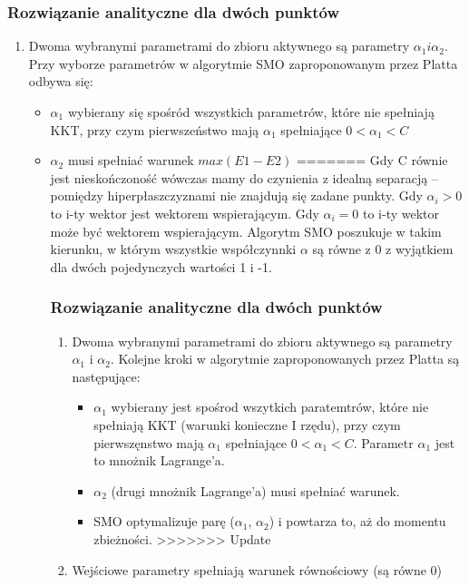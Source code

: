 \documentclass[[10pt,a4paper]{article}
\begin{document}
\subsubsection{Rozwiązanie analityczne dla dwóch punktów}
\begin{enumerate}
\item Dwoma wybranymi parametrami do zbioru aktywnego są parametry $\alpha_1 i \alpha_2$. Przy wyborze parametrów w algorytmie SMO zaproponowanym przez Platta odbywa się:
\begin{itemize}
\item $\alpha_1$ wybierany się spośród wszystkich parametrów, które nie spełniają KKT, przy czym pierwszeństwo mają $\alpha_1$ spełniające $ 0 < \alpha_{1} < C $
\item $\alpha_2$ musi spełniać warunek $max(E1-E2)$
=======
Gdy C równie jest nieskończoność wówczas mamy do czynienia z idealną separacją – pomiędzy hiperpłaszczyznami nie znajdują się zadane punkty. 
Gdy $\alpha_{i} > 0 $ to i-ty wektor jest wektorem wspierającym.
Gdy $\alpha_{i} = 0 $ to i-ty wektor może być wektorem wspierającym.
\newline
Algorytm SMO poszukuje w takim kierunku, w którym wszystkie współczynnki $\alpha$ są równe z 0 z wyjątkiem dla dwóch pojedynczych wartości 1 i -1. 

\subsubsection{Rozwiązanie analityczne dla dwóch punktów}
\begin{enumerate}
\item Dwoma wybranymi parametrami do zbioru aktywnego są parametry $\alpha_1$ i $ \alpha_2$. Kolejne kroki w algorytmie zaproponowanych przez Platta są następujące:
\begin{itemize}
\item $\alpha_1$ wybierany jest spośrod wszytkich paratemtrów, które nie spełniają KKT (warunki konieczne I rzędu), przy czym pierwszęnstwo mają $\alpha_1$ spełniające $ 0 < \alpha_{1} < C $. Parametr $\alpha_1$ jest to mnożnik Lagrange'a. 
\item $\alpha_2$ (drugi mnożnik Lagrange'a) musi spełniać warunek. 
\item SMO optymalizuje parę ($\alpha_1$, $\alpha_2$) i powtarza to, aż do momentu zbieżności. 
>>>>>>> Update
\end{itemize}
\item Wejściowe parametry spełniają warunek równościowy (są równe 0)



\end{enumerate}
\end{itemize}
\end{enumerate}
\end{document}
